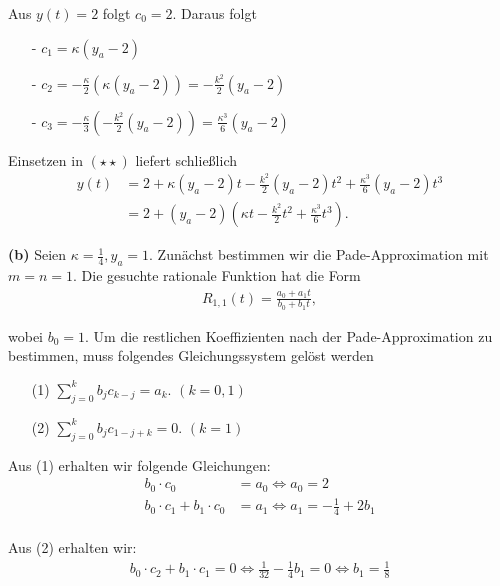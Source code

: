 \documentclass[10pt]{article}
\begin{document}
  Aus $y(t) = 2$ folgt $c_0 = 2$. Daraus folgt
  \begin{itemize}
    \item[-] $c_1 = \kappa(y_a - 2)$
    \item[-] $c_2 = -\frac{\kappa}{2} (\kappa (y_a - 2)) = -\frac{k^2}{2}(y_a - 2)$ 
    \item[-] $c_3 = -\frac{\kappa}{3}(-\frac{k^2}{2}(y_a - 2)) = \frac{\kappa^3}{6}(y_a - 2)$
  \end{itemize}

  Einsetzen in $(\star\star)$ liefert schließlich 
  \begin{align*}
    y(t) &= 2 + \kappa(y_a - 2)t - \frac{k^2}{2}(y_a - 2)t^2 + \frac{\kappa^3}{6}(y_a - 2)t^3 \\
         &= 2 + (y_a - 2) \left( \kappa t - \frac{k^2}{2} t^2 + \frac{\kappa^3}{6} t^3 \right). \qquad 
  \end{align*}
  
  \newpage 

  \textbf{(b)} Seien $\kappa = \frac{1}{4}, y_a = 1$. Zunächst bestimmen wir die Pade-Approximation mit $m=n=1$. 
    Die gesuchte rationale Funktion hat die Form 
    \begin{align*}
      R_{1,1}(t) = \frac{a_0 + a_1t}{b_0 + b_1t},
    \end{align*}

    wobei $b_0 = 1$.
    Um die restlichen Koeffizienten nach der Pade-Approximation zu bestimmen, muss folgendes Gleichungssystem gelöst werden
    \begin{enumerate}
      \item[(1)] $\sum_{j=0}^{k} b_j c_{k-j} = a_k$. \quad $(k = 0,1)$
      \item[(2)] $\sum_{j=0}^{k} b_j c_{1-j+k} = 0$. \quad $(k = 1)$ 
    \end{enumerate}

    Aus (1) erhalten wir folgende Gleichungen: 
    \begin{align*}
      b_0\cdot c_0 &= a_0 \iff a_0 = 2    \\
      b_0\cdot c_1 + b_1\cdot c_0 &= a_1 \iff a_1 = -\frac{1}{4} + 2b_1   \\
    \end{align*}

    Aus (2) erhalten wir: 
    \begin{align*}
      b_0\cdot c_2 + b_1\cdot c_1 = 0 \iff \frac{1}{32} - \frac{1}{4}b_1 = 0 \iff b_1 = \frac{1}{8}
    \end{align*}
\end{document}
